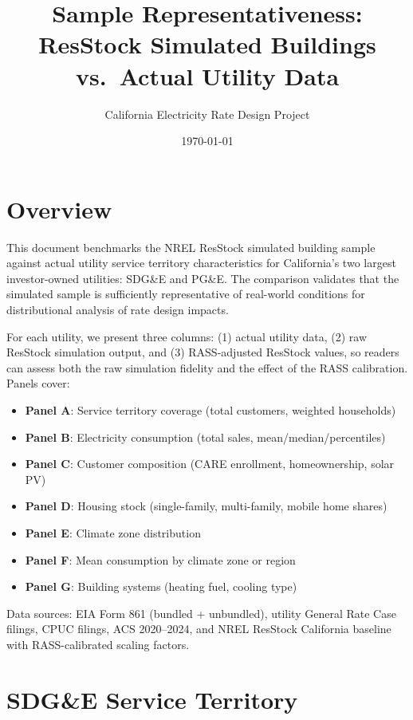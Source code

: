 \documentclass[12pt]{article}
\title{Sample Representativeness: ResStock Simulated Buildings vs.\ Actual Utility Data}
\author{California Electricity Rate Design Project}
\date{\today}
\begin{document}
\maketitle

\section{Overview}

This document benchmarks the NREL ResStock simulated building sample against actual utility service territory characteristics for California's two largest investor-owned utilities: SDG\&E and PG\&E. The comparison validates that the simulated sample is sufficiently representative of real-world conditions for distributional analysis of rate design impacts.

For each utility, we present three columns: (1) actual utility data, (2) raw ResStock simulation output, and (3) RASS-adjusted ResStock values, so readers can assess both the raw simulation fidelity and the effect of the RASS calibration. Panels cover:
\begin{itemize}
    \item \textbf{Panel A}: Service territory coverage (total customers, weighted households)
    \item \textbf{Panel B}: Electricity consumption (total sales, mean/median/percentiles)
    \item \textbf{Panel C}: Customer composition (CARE enrollment, homeownership, solar PV)
    \item \textbf{Panel D}: Housing stock (single-family, multi-family, mobile home shares)
    \item \textbf{Panel E}: Climate zone distribution
    \item \textbf{Panel F}: Mean consumption by climate zone or region
    \item \textbf{Panel G}: Building systems (heating fuel, cooling type)
\end{itemize}

\noindent Data sources: EIA Form 861 (bundled + unbundled), utility General Rate Case filings, CPUC filings, ACS 2020--2024, and NREL ResStock California baseline with RASS-calibrated scaling factors.

\clearpage

\section{SDG\&E Service Territory}
\end{document}
